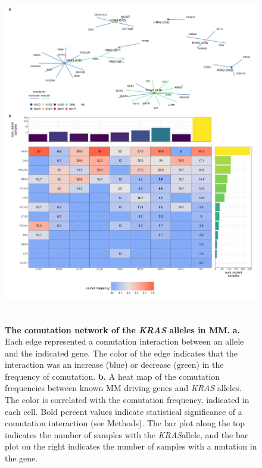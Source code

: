 \documentclass[english, 12pt, letterpaper]{article}
\newcommand{\KRAS}{\emph{KRAS}}
\begin{document}
\begin{figure}[p]
\centering
\includegraphics[height=150mm]{figures/SuppFigure_09.jpeg}
\caption{
    \textbf{The comutation network of the \KRAS{} alleles in MM.} 
    \textbf{a.} Each edge represented a comutation interaction between an allele and the indicated gene. The color of the edge indicates that the interaction was an increase (blue) or decrease (green) in the frequency of comutation.
    \textbf{b.} A heat map of the comutation frequencies between known MM driving genes and \KRAS{} alleles. The color is correlated with the comutation frequency, indicated in each cell. Bold percent values indicate statistical significance of a comutation interaction (see Methods). The bar plot along the top indicates the number of samples with the \KRAS allele, and the bar plot on the right indicates the number of samples with a mutation in the gene.
}
\label{sfig:mm_labeled-comutation}
\end{figure}
\end{document}
